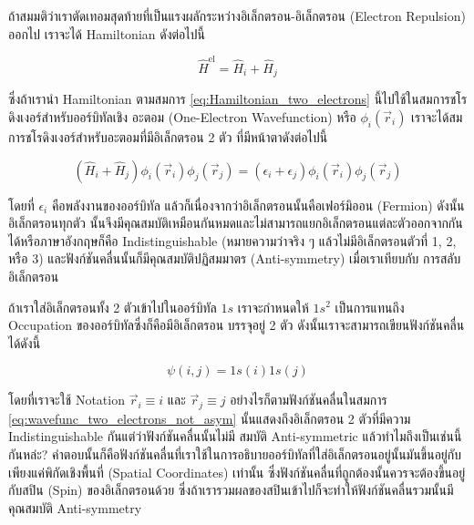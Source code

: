 ถ้าสมมติว่าเราตัดเทอมสุดท้ายที่เป็นแรงผลักระหว่างอิเล็กตรอน-อิเล็กตรอน (Electron Repulsion) ออกไป เราจะได้ Hamiltonian ดังต่อไปนี้

\begin{equation}
  \label{eq:Hamiltonian_two_electrons}
  \hat{H}^{\text{el}}
  =
  \hat{H}_{i} + \hat{H}_{j}
\end{equation}

\noindent ซึ่งถ้าเรานำ Hamiltonian ตามสมการ \eqref{eq:Hamiltonian_two_electrons} นี้ไปใช้ในสมการชโรดิงเงอร์สำหรับออร์บิทัลเชิง%
อะตอม (One-Electron Wavefunction) หรือ $\phi_{i}(\vec{r}_{i})$ เราจะได้สมการชโรดิงเงอร์สำหรับอะตอมที่มีอิเล็กตรอน 2 ตัว
ที่มีหน้าตาดังต่อไปนี้

\begin{equation}
  \left( \hat{H}_{i} + \hat{H}_{j} \right)
  \phi_{i}(\vec{r}_{i})
  \phi_{j}(\vec{r}_{j})
  =
  \left( \epsilon_{i} + \epsilon_{j} \right)
  \phi_{i}(\vec{r}_{i})
  \phi_{j}(\vec{r}_{j})
\end{equation}

\noindent โดยที่ $\epsilon_{i}$ คือพลังงานของออร์บิทัล แล้วก็เนื่องจากว่าอิเล็กตรอนนั้นคือเฟอร์มิออน (Fermion) ดังนั้นอิเล็กตรอนทุกตัว%
นั้นจึงมีคุณสมบัติเหมือนกันหมดและไม่สามารถแยกอิเล็กตรอนแต่ละตัวออกจากกันได้หรือภาษาอังกฤษก็คือ Indistinguishable
(หมายความว่าจริง ๆ แล้วไม่มีอิเล็กตรอนตัวที่ 1, 2, หรือ 3) และฟังก์ชันคลื่นนั้นก็มีคุณสมบัติปฏิสมมาตร (Anti-symmetry) เมื่อเราเทียบกับ%
การสลับอิเล็กตรอน

ถ้าเราใส่อิเล็กตรอนทั้ง 2 ตัวเข้าไปในออร์บิทัล $1s$ เราจะกำหนดให้ $1 s^2$ เป็นการแทนถึง Occupation ของออร์บิทัลซึ่งก็คือมีอิเล็กตรอน%
บรรจุอยู่ 2 ตัว ดังนั้นเราจะสามารถเขียนฟังก์ชันคลื่นได้ดังนี้

\begin{equation}
  \label{eq:wavefunc_two_electrons_not_asym}
  \psi(i, j) = 1 s(i) 1 s(j)
\end{equation}

\noindent โดยที่เราจะใช้ Notation $\vec{r}_i \equiv i$ และ $\vec{r}_j \equiv j$ อย่างไรก็ตามฟังก์ชันคลื่นในสมการ
\eqref{eq:wavefunc_two_electrons_not_asym} นั้นแสดงถึงอิเล็กตรอน 2 ตัวที่มีความ Indistinguishable กันแต่ว่าฟังก์ชันคลื่นนั้นไม่มี%
สมบัติ Anti-symmetric แล้วทำไมถึงเป็นเช่นนี้กันหล่ะ? คำตอบนั้นก็คือฟังก์ชันคลื่นที่เราใช้ในการอธิบายออร์บิทัลที่ใส่อิเล็กตรอนอยู่นั้นมันขึ้นอยู่กับ%
เพียงแค่พิกัดเชิงพื้นที่ (Spatial Coordinates) เท่านั้น ซึ่งฟังก์ชันคลื่นที่ถูกต้องนั้นควรจะต้องขึ้นอยู่กับสปิน (Spin) ของอิเล็กตรอนด้วย%
ซึ่งถ้าเรารวมผลของสปินเข้าไปก็จะทำให้ฟังก์ชันคลื่นรวมนั้นมีคุณสมบัติ Anti-symmetry

